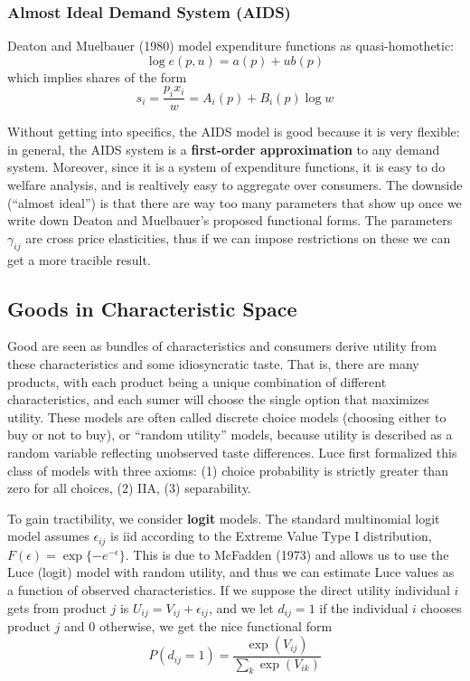\subsubsection{Almost Ideal Demand System (AIDS)}
\label{sec:almost-ideal-demand}

Deaton and Muelbauer (1980) model expenditure functions as
quasi-homothetic:
\[
\log e(p,u) = a(p) + ub(p)
\]
which implies shares of the form
\[
s_i 
= \frac{p_ix_i}{w}
= A_i(p) + B_i(p) \log w
\]

Without getting into specifics, the AIDS model is good because it is
very flexible: in general, the AIDS system is a \textbf{first-order
  approximation} to any demand system. Moreover, since it is a system
of expenditure functions, it is easy to do welfare analysis, and is
realtively easy to aggregate over consumers. The downside (``almost
ideal'') is that there are way too many parameters that show up once
we write down Deaton and Muelbauer's proposed functional forms. The
parameters $\gamma_{ij}$ are cross price elasticities, thus if we can
impose restrictions on these we can get a more tracible result.

\subsection{Goods in Characteristic Space}
\label{sec:goods-char-space}

Good are seen as bundles of characteristics and consumers derive
utility from these characteristics and some idiosyncratic taste.  That
is, there are many products, with each product being a unique
combination of different characteristics, and each sumer will choose
the single option that maximizes utility. These models are often
called discrete choice models (choosing either to buy or not to buy),
or ``random utility'' models, because utility is described as a random
variable reflecting unobserved taste differences. Luce first
formalized this class of models with three axioms: (1) choice
probability is strictly greater than zero for all choices, (2) IIA,
(3) separability.

To gain tractibility, we consider \textbf{logit} models. The standard
multinomial logit model assumes $\epsilon_{ij}$ is iid according to
the Extreme Value Type I distribution, $F(\epsilon) =
\exp\{-e^{-\epsilon}\}$. This is due to McFadden (1973) and allows us
to use the Luce (logit) model with random utility, and thus we can
estimate Luce values as a function of observed characteristics. If we
suppose the direct utility individual $i$ gets from product $j$ is
$U_{ij} = V_{ij} + \epsilon_{ij}$, and we let $d_{ij} = 1$ if the
individual $i$ chooses product $j$ and $0$ otherwise, we get the nice
functional form
\[
P(d_{ij} = 1) 
= \frac{\exp(V_{ij})}{\sum_{k} \exp(V_{ik})}
\]


